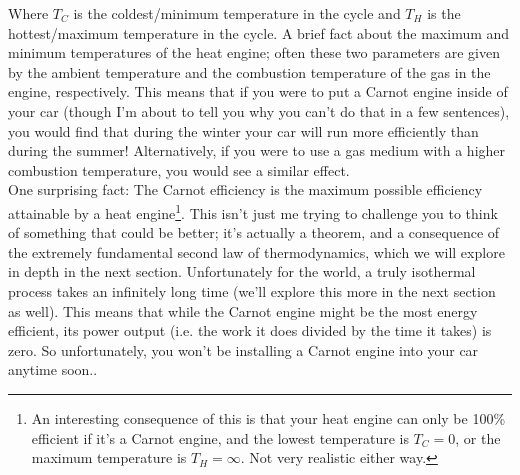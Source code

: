 Where $T_C$ is the coldest/minimum temperature in the cycle and $T_H$ is the hottest/maximum temperature in the cycle. A brief fact about the maximum and minimum temperatures of the heat engine; often these two parameters are given by the ambient temperature and the combustion temperature of the gas in the engine, respectively. This means that if you were to put a Carnot engine inside of your car (though I'm about to tell you why you can't do that in a few sentences), you would find that during the winter your car will run more efficiently than during the summer! Alternatively, if you were to use a gas medium with a higher combustion temperature, you would see a similar effect.\\
One surprising fact: The Carnot efficiency is the maximum possible efficiency attainable by a heat engine\footnote{An interesting consequence of this is that your heat engine can only be 100\% efficient if it's a Carnot engine, and the lowest temperature is $T_C=0$, or the maximum temperature is $T_H = \infty$. Not very realistic either way.}. This isn't just me trying to challenge you to think of something that could be better; it's actually a theorem, and a consequence of the extremely fundamental second law of thermodynamics, which we will explore in depth in the next section. Unfortunately for the world, a truly isothermal process takes an infinitely long time (we'll explore this more in the next section as well). This means that while the Carnot engine might be the most energy efficient, its power output (i.e. the work it does divided by the time it takes) is zero. So unfortunately, you won't be installing a Carnot engine into your car anytime soon..
